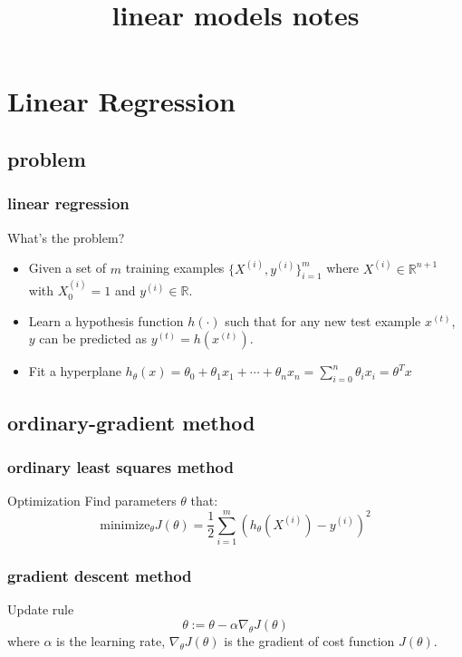 \documentclass[11pt]{beamer}
\title{linear models notes}
\begin{document}
\begin{frame}
	\titlepage
\end{frame}


\section{Linear Regression}
\subsection{problem}
\begin{frame}
	\frametitle{\textbf{linear regression}}
	\begin{block}{What's the problem?}
	\begin{itemize}
		\item Given a set of $m$ training examples $\{X^{(i)}, y^{(i)}\}_{i=1}^m$ 
		where $X^{(i)} \in \mathbb{R}^{n+1}$
		with $X^{(i)}_0 = 1$ and $y^{(i)} \in \mathbb{R}$.
		\item Learn a hypothesis function $h(\cdot)$ such that for any new test example $x^{(t)}$, $y$ can be predicted as 
		$y^{(t)} = h(x^{(t)})$.
		\item Fit a hyperplane $h_\theta(x) = \theta_0 + \theta_1 x_1 + \cdots + \theta_n x_n = \sum_{i=0}^n \theta_i x_i = \theta^T x$
	\end{itemize}
	\end{block}
\end{frame}

\subsection{ordinary-gradient method}
\begin{frame}
	\frametitle{ordinary least squares method}
	\begin{block}{Optimization}
	Find parameters $\theta$ that:
	\begin{equation*}	
		\textrm{minimize}_\theta J(\theta) = \frac{1}{2} \sum_{i=1}^{m} (h_\theta (X^{(i)}) - y^{(i)})^2
	\end{equation*} 
   	\end{block}
\end{frame}

\begin{frame}
	\frametitle{gradient descent method}
	\begin{block}{Update rule}
     	\begin{equation*}
		\theta := \theta - \alpha \nabla_\theta J(\theta)
	\end{equation*}
	\indent where $\alpha$ is the learning rate, 
	$\nabla_\theta J(\theta)$ is the gradient of cost function $J(\theta)$.
   	\end{block}
\end{frame}
\end{document}
